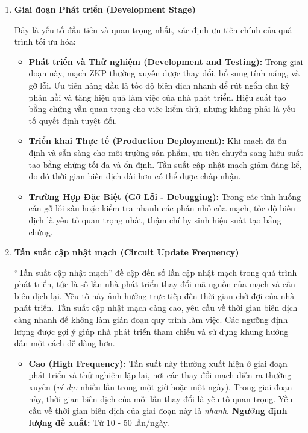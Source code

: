 \begin{enumerate}
    \item \textbf{Giai đoạn Phát triển (Development Stage)}

    Đây là yếu tố đầu tiên và quan trọng nhất, xác định ưu tiên chính của quá trình tối ưu hóa:
    \begin{itemize}
        \item \textbf{Phát triển và Thử nghiệm (Development and Testing):} Trong giai đoạn này, mạch ZKP thường xuyên được thay đổi, bổ sung tính năng, và gỡ lỗi. Ưu tiên hàng đầu là tốc độ biên dịch nhanh để rút ngắn chu kỳ phản hồi và tăng hiệu quả làm việc của nhà phát triển. Hiệu suất tạo bằng chứng vẫn quan trọng cho việc kiểm thử, nhưng không phải là yếu tố quyết định tuyệt đối.
        \item \textbf{Triển khai Thực tế (Production Deployment): }Khi mạch đã ổn định và sẵn sàng cho môi trường sản phẩm, ưu tiên chuyển sang hiệu suất tạo bằng chứng tối đa và ổn định. Tần suất cập nhật mạch giảm đáng kể, do đó thời gian biên dịch dài hơn có thể được chấp nhận. 
        \item \textbf{Trường Hợp Đặc Biệt (Gỡ Lỗi - Debugging): }Trong các tình huống cần gỡ lỗi sâu hoặc kiểm tra nhanh các phần nhỏ của mạch, tốc độ biên dịch là yếu tố quan trọng nhất, thậm chí hy sinh hiệu suất tạo bằng chứng.
    \end{itemize}
    
    \item \textbf{Tần suất cập nhật mạch (Circuit Update Frequency)}

    ``Tần suất cập nhật mạch'' đề cập đến số lần cập nhật mạch trong quá trình phát triển, tức là số lần nhà phát triển thay đổi mã nguồn của mạch và cần biên dịch lại. Yếu tố này ảnh hưởng trực tiếp đến thời gian chờ đợi của nhà phát triển. Tần suất cập nhật mạch càng cao, yêu cầu về thời gian biên dịch càng nhanh để không làm gián đoạn quy trình làm việc. Các ngưỡng định lượng được gợi ý giúp nhà phát triển tham chiếu và sử dụng khung hướng dẫn một cách dễ dàng hơn.


    \begin{itemize}
        \item \textbf{Cao (High Frequency):} Tần suất này thường xuất hiện ở giai đoạn phát triển và thử nghiệm lặp lại, nơi các thay đổi mạch diễn ra thường xuyên (\textit{ví dụ:} nhiều lần trong một giờ hoặc một ngày). Trong giai đoạn này, thời gian biên dịch của mỗi lần thay đổi là yếu tố quan trọng. Yều cầu về thời gian biên dịch của giai đoạn này là \textit{nhanh}. \textbf{Ngưỡng định lượng đề xuất:} Từ 10 - 50 lần/ngày.
        

\end{itemize}
\end{enumerate}
